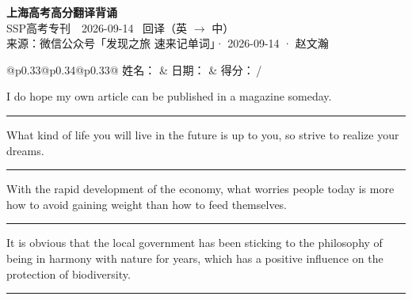 \documentclass[11pt,a4paper]{article}
\newcommand{\num}[1]{\makebox[1.9em][r]{#1.}\hspace{0.3em}}
\newcommand{\wline}{\noindent\rule{\linewidth}{0.4pt}}
\begin{document}
\pagestyle{plain}
\begin{center}
{\LARGE\bfseries 上海高考高分翻译背诵 }\\[0.25em]
{\large SSP高考专刊　2026-09-14 \quad\ 回译（英 $\to$ 中）}\\[0.35em]
{\footnotesize 来源：微信公众号「发现之旅 速来记单词」· 2026-09-14 · 赵文瀚}
\end{center}

\vspace{0.4em}
\noindent\begin{tabular}{@{}p{0.33\textwidth}@{}p{0.34\textwidth}@{}p{0.33\textwidth}@{}}
姓名：\underline{\hspace{2.0cm}} & 日期：\underline{\hspace{2.0cm}} & 得分：\underline{\hspace{1.4cm}}\,/ \\
\end{tabular}

\vspace{0.5em}

\vspace{0.8em}
\num{1}I do hope my own article can be published in a magazine someday.

\vspace{0.25em}

\wline

\num{2}What kind of life you will live in the future is up to you, so strive to realize your dreams.

\vspace{0.25em}

\wline

\num{3}With the rapid development of the economy, what worries people today is more how to avoid gaining weight than how to feed themselves.

\vspace{0.25em}

\wline

\num{4}It is obvious that the local government has been sticking to the philosophy of being in harmony with nature for years, which has a positive influence on the protection of biodiversity.

\vspace{0.25em}

\wline
\end{document}
